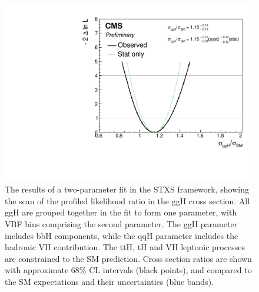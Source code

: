 
\begin{figure}[hptb]
\centering
\includegraphics[width=\textwidth]{Figures/Results/ObsStage0_r_ggH.pdf}
\caption{
  The results of a two-parameter fit in the STXS framework,
  showing the scan of the profiled likelihood ratio in the ggH cross section.
  All ggH are grouped together in the fit to form one parameter, 
  with VBF bins comprising the second parameter.
  The ggH parameter includes bbH components, 
  while the qqH parameter includes the hadronic VH contribution. 
  The ttH, tH and VH leptonic processes are constrained to the SM prediction. 
  Cross section ratios are shown with approximate 68\% CL intervals (black points), 
  and compared to the SM expectations and their uncertainties (blue bands).
}
\label{fig:results_Stage0_ggH}
\end{figure}

